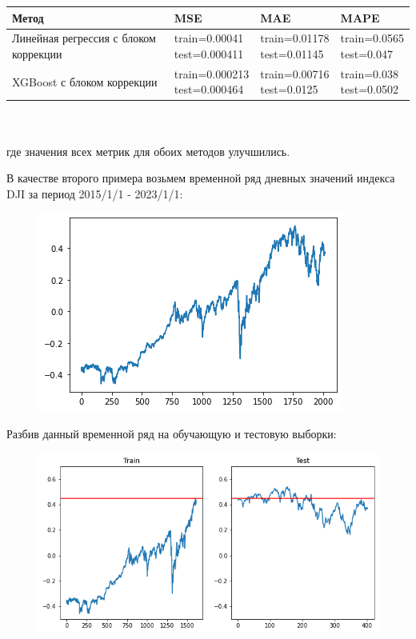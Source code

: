\documentclass[11pt]{article}
\begin{document}
\begin{tabular}{ |p{3cm}|p{3cm}|p{3cm}|p{3cm}|  }
 \hline
 Метод & MSE &  MAE & MAPE \\
 \hline
 Линейная регрессия с блоком коррекции &
 \makecell{train=0.00041 \\ test=0.000411} &
 \makecell{train=0.01178 \\ test=0.01145} &
 \makecell{train=0.0565 \\ test=0.047} \\
 \hline
 XGBoost с блоком коррекции &
 \makecell{train=0.000213 \\ test=0.000464} &
 \makecell{train=0.00716 \\ test=0.0125} &
 \makecell{train=0.038 \\ test=0.0502} \\
 \hline
\end{tabular}
\\
\\
где значения всех метрик для обоих методов улучшились.

В качестве второго примера возьмем временной ряд дневных значений индекса DJI за период 2015/1/1 - 2023/1/1:
\begin{figure}[H]
\centering
\includegraphics[scale=0.5]{dji_2015_01_01_2023_01_01.png}
\label{}
\end{figure}

Разбив данный временной ряд на обучающую и тестовую выборки:
\begin{figure}[H]
\centering
\includegraphics[scale=0.5]{dji_train_test.png}
\label{}
\end{figure}
\end{document}
